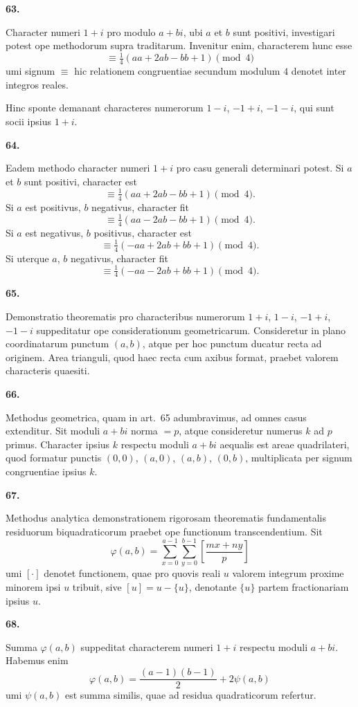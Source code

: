 \documentclass[12pt,a4paper]{article}
\newcommand{\art}[1]{\begin{center}\textbf{#1.}\end{center}}
\begin{document}
\art{63}

Character numeri $1+i$ pro modulo $a+bi$, ubi $a$ et $b$ sunt positivi, investigari potest ope methodorum supra traditarum. Invenitur enim, characterem hunc esse
\[\equiv \tfrac{1}{4}(aa+2ab-bb+1) \pmod{4}\]
umi signum $\equiv$ hic relationem congruentiae secundum modulum $4$ denotet inter integros reales.

Hinc sponte demanant characteres numerorum $1-i$, $-1+i$, $-1-i$, qui sunt socii ipsius $1+i$.

\art{64}

Eadem methodo character numeri $1+i$ pro casu generali determinari potest. Si $a$ et $b$ sunt positivi, character est
\[\equiv \tfrac{1}{4}(aa+2ab-bb+1) \pmod{4}.\]
Si $a$ est positivus, $b$ negativus, character fit
\[\equiv \tfrac{1}{4}(aa-2ab-bb+1) \pmod{4}.\]
Si $a$ est negativus, $b$ positivus, character est
\[\equiv \tfrac{1}{4}(-aa+2ab+bb+1) \pmod{4}.\]
Si uterque $a$, $b$ negativus, character fit
\[\equiv \tfrac{1}{4}(-aa-2ab+bb+1) \pmod{4}.\]

\art{65}

Demonstratio theorematis pro characteribus numerorum $1+i$, $1-i$, $-1+i$, $-1-i$ suppeditatur ope considerationum geometricarum. Consideretur in plano coordinatarum punctum $(a,b)$, atque per hoc punctum ducatur recta ad originem. Area trianguli, quod haec recta cum axibus format, praebet valorem characteris quaesiti.

\art{66}

Methodus geometrica, quam in art.~65 adumbravimus, ad omnes casus extenditur. Sit moduli $a+bi$ norma $=p$, atque consideretur numerus $k$ ad $p$ primus. Character ipsius $k$ respectu moduli $a+bi$ aequalis est areae quadrilateri, quod formatur punctis $(0,0)$, $(a,0)$, $(a,b)$, $(0,b)$, multiplicata per signum congruentiae ipsius $k$.

\art{67}

Methodus analytica demonstrationem rigorosam theorematis fundamentalis residuorum biquadraticorum praebet ope functionum transcendentium. Sit
\[\varphi(a,b) = \sum_{x=0}^{a-1} \sum_{y=0}^{b-1} \left[\frac{mx+ny}{p}\right]\]
umi $[\cdot]$ denotet functionem, quae pro quovis reali $u$ valorem integrum proxime minorem ipsi $u$ tribuit, sive $[u]=u-\{u\}$, denotante $\{u\}$ partem fractionariam ipsius $u$.

\art{68}

Summa $\varphi(a,b)$ suppeditat characterem numeri $1+i$ respectu moduli $a+bi$. Habemus enim
\[\varphi(a,b) = \frac{(a-1)(b-1)}{2} + 2\psi(a,b)\]
umi $\psi(a,b)$ est summa similis, quae ad residua quadraticorum refertur.
\end{document}
